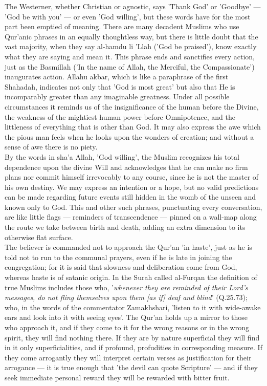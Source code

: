 \documentclass[11pt, b5paper, twoside]{book}
\begin{document}
The Westerner, whether Christian or agnostic, says 'Thank God' or 'Goodbye' --- 'God be with you' --- or 
even 'God willing', but these words have for the most part been emptied of meaning. There are many 
decadent Muslims who use Qur'anic phrases in an equally thoughtless way, but there is little doubt 
that the vast majority, when they say al-hamdu li 'Llah ('God be praised'), know exactly what they 
are saying and mean it. This phrase ends and sanctifies every action, just as the Basmillah ('In the 
name of Allah, the Merciful, the Compassionate') inaugurates action. Allahu akbar, which is like a 
paraphrase of the first Shahadah, indicates not only that 'God is most great' but also that He is 
incomparably greater than any imaginable greatness. Under all possible circumstances it reminds us of 
the insignificance of the human before the Divine, the weakness of the mightiest human power before 
Omnipotence, and the littleness of everything that is other than God. It may also express the awe 
which the pious man feels when he looks upon the wonders of creation; and without a sense of awe 
there is no piety. \\

By the words in sha'a Allah, 'God willing', the Muslim recognizes his total dependence upon the 
divine Will and acknowledges that he can make no firm plans nor commit himself irrevocably to any 
course, since he is not the master of his own destiny. We may express an intention or a hope, but no 
valid predictions can be made regarding future events still hidden in the womb of the unseen and 
known only to God. This and other such phrases, punctuating every conversation, are like little flags 
--- reminders of transcendence --- pinned on a wall-map along the route we take between birth and death, adding an extra dimension to its otherwise flat surface. \\

The believer is commanded not to approach the Qur'an 'in haste', just as he is told not to run to the 
communal prayers, even if he is late in joining the congregation; for it is said that slowness and 
deliberation come from God, whereas haste is of satanic origin. In the Surah called al-Furqan the 
definition of true Muslims includes those who, '\emph{whenever they are reminded of their Lord's messages, do not fling themselves upon them [as if] deaf and blind}' (Q.25.73); who, in the words of the 
commentator Zamakhshari, 'listen to it with wide-awake ears and look into it with seeing eyes'. The 
Qur'an holds up a mirror to those who approach it, and if they come to it for the wrong reasons or in 
the wrong spirit, they will find nothing there. If they are by nature superficial they will find in 
it only superficialities, and if profound, profudities in corresponding measure. If they come 
arrogantly they will interpret certain verses as justification for their arrogance --- it is true 
enough that 'the devil can quote Scripture' --- and if they seek immediate personal reward they will be 
rewarded with bitter fruit. \\
\end{document}
